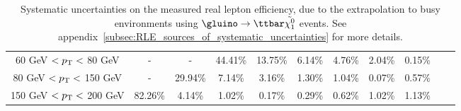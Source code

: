 \begin{center}
\begin{table}
{\begin{tabular}{ccccccccccc}
60 GeV $< p_{\text T} <$ 80 GeV & - & - & 44.41\% & 13.75\% & 6.14\% & 4.76\% & 2.04\% & 0.15\%\\
80 GeV $< p_{\text T} <$ 150 GeV & - & 29.94\% & 7.14\% & 3.16\% & 1.30\% & 1.04\% & 0.07\% & 0.57\%\\
150 GeV $< p_{\text T} <$ 200 GeV & 82.26\% & 4.14\% & 1.02\% & 0.17\% & 0.29\% & 0.62\% & 1.02\% & 1.13\%\\
\hline
\hline
\end{tabular}
}
\caption{
Systematic uncertainties on the measured real lepton efficiency, due to the extrapolation to busy environments using $\gluino \to \ttbar \tilde{\chi_1^0}$ events. See appendix~\ref{subsec:RLE_sources_of_systematic_uncertainties} for more details.
}
\label{tab:RLE_systematics_busy}
\end{table}
\end{center}
